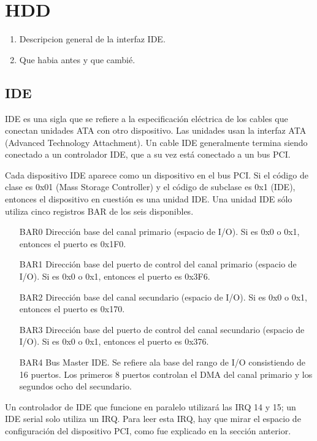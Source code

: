 \newpage

\section{HDD}
\begin{enumerate}
  \item Descripcion general de la interfaz IDE.
  \item Que habia antes y que cambié.
\end{enumerate}

\subsection{IDE}
IDE es una sigla que se refiere a la especificación eléctrica de los cables que conectan unidades ATA con otro dispositivo. Las unidades usan la interfaz ATA (Advanced Technology Attachment). Un cable IDE generalmente termina siendo conectado a un controlador IDE, que a su vez está conectado a un bus PCI.

Cada dispositivo IDE aparece como un dispositivo en el bus PCI. Si el código de clase es 0x01 (Mass Storage Controller) y el código de subclase es 0x1 (IDE), entonces el dispositivo en cuestión es una unidad IDE. Una unidad IDE sólo utiliza cinco registros BAR de los seis disponibles.

\begin{enumerate}
 \item[BAR0] Dirección base del canal primario (espacio de I/O). Si es 0x0 o 0x1, entonces el puerto es 0x1F0.
 \item[BAR1] Dirección base del puerto de control del canal primario (espacio de I/O). Si es 0x0 o 0x1, entonces el puerto es 0x3F6.
 \item[BAR2] Dirección base del canal secundario (espacio de I/O). Si es 0x0 o 0x1, entonces el puerto es 0x170.
 \item[BAR3] Dirección base del puerto de control del canal secundario (espacio de I/O). Si es 0x0 o 0x1, entonces el puerto es 0x376.
 \item[BAR4] Bus Master IDE. Se refiere ala base del rango de I/O consistiendo de 16 puertos. Los primeros 8 puertos controlan el DMA del canal primario y los segundos ocho del secundario.
\end{enumerate}

Un controlador de IDE que funcione en paralelo utilizará las IRQ 14 y 15; un IDE serial solo utiliza un IRQ. Para leer esta IRQ, hay que mirar el espacio de configuración del dispositivo PCI, como fue explicado en la sección anterior.


